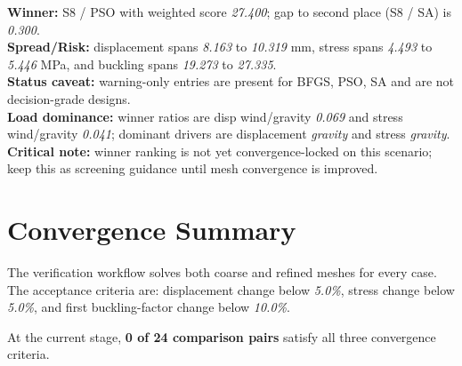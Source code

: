 \begin{table}[H]
\centering
\scriptsize
\setlength{\tabcolsep}{4pt}
\renewcommand{\arraystretch}{1.1}
\end{table}


\begin{samepage}
\noindent \textbf{Winner:} S8 / PSO with weighted score \textit{27.400}; gap to second place (S8 / SA) is \textit{0.300}.\\
\noindent \textbf{Spread/Risk:} displacement spans \textit{8.163} to \textit{10.319} mm, stress spans \textit{4.493} to \textit{5.446} MPa, and buckling spans \textit{19.273} to \textit{27.335}.\\
\noindent \textbf{Status caveat:} warning-only entries are present for BFGS, PSO, SA and are not decision-grade designs.\\
\noindent \textbf{Load dominance:} winner ratios are disp wind/gravity \textit{0.069} and stress wind/gravity \textit{0.041}; dominant drivers are displacement \textit{gravity} and stress \textit{gravity}.\\
\noindent \textbf{Critical note:} winner ranking is not yet convergence-locked on this scenario; keep this as screening guidance until mesh convergence is improved.
\end{samepage}


\chapter{Convergence Summary}


\noindent The verification workflow solves both coarse and refined meshes for every case. The acceptance criteria are: displacement change below \textit{5.0\%}, stress change below \textit{5.0\%}, and first buckling-factor change below \textit{10.0\%}.


\noindent At the current stage, \textbf{0 of 24 comparison pairs} satisfy all three convergence criteria.

